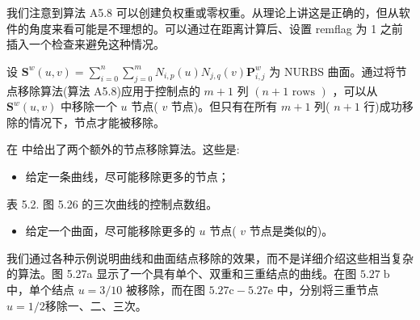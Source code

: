 \documentclass[../main.tex]{subfiles}
\begin{document}
我们注意到算法 A5.8 可以创建负权重或零权重。从理论上讲这是正确的，但从软件的角度来看可能是不理想的。可以通过在距离计算后、设置 remflag 为 1 之前插入一个检查来避免这种情况。

设 \({\mathbf{S}}^{w}\left( {u,v}\right)  = \mathop{\sum }\limits_{{i = 0}}^{n}\mathop{\sum }\limits_{{j = 0}}^{m}{N}_{i,p}\left( u\right) {N}_{j,q}\left( v\right) {\mathbf{P}}_{i,j}^{w}\) 为 NURBS 曲面。通过将节点移除算法(算法 A5.8)应用于控制点的 \(m + 1\) 列 \(\left( {n + 1\text{ rows }}\right)\) ，可以从 \({\mathbf{S}}^{w}\left( {u,v}\right)\) 中移除一个 \(u\) 节点( \(v\) 节点)。但只有在所有 \(m + 1\) 列( \(n + 1\) 行)成功移除的情况下，节点才能被移除。

在 \cite{Till92} 中给出了两个额外的节点移除算法。这些是:

\begin{itemize}
\item 给定一条曲线，尽可能移除更多的节点；
\end{itemize}

表 5.2. 图 5.26 的三次曲线的控制点数组。

\begin{center}
\end{center}

\begin{itemize}
\item 给定一个曲面，尽可能移除更多的 \(u\) 节点( \(v\) 节点是类似的)。
\end{itemize}

我们通过各种示例说明曲线和曲面结点移除的效果，而不是详细介绍这些相当复杂的算法。图 5.27a 显示了一个具有单个、双重和三重结点的曲线。在图 \({5.27}\mathrm{\;b}\) 中，单个结点 \(u = 3/{10}\) 被移除，而在图 \({5.27}\mathrm{c} - {5.27}\mathrm{e}\) 中，分别将三重节点\(u=1/2\)移除一、二、三次。
\end{document}
